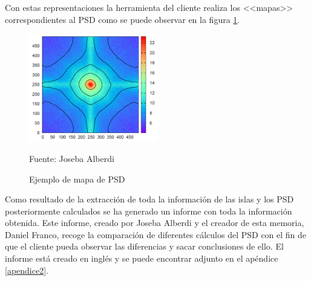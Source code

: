 Con estas representaciones la herramienta del cliente realiza los <<mapas>> correspondientes al PSD como se puede observar en la figura \ref{PSDmap}.

\begin{figure}[H]
	\captionsetup{justification=centering}
	\centering
	\includegraphics[width=0.5\textwidth]{./imagenes/PSDmap}
	\caption{Ejemplo de mapa de PSD}	
	Fuente: Joseba Alberdi
	\label{PSDmap}
\end{figure}

	
Como resultado de la extracci\'{o}n de toda la informaci\'{o}n de las islas y los PSD posteriormente calculados se ha generado un informe con toda la informaci\'{o}n obtenida. Este informe, creado por Joseba Alberdi y el creador de esta memoria, Daniel Franco, recoge la comparaci\'{o}n de diferentes c\'{a}lculos del PSD con el fin de que el cliente pueda observar las diferencias y sacar conclusiones de ello. El informe est\'{a} creado en ingl\'{e}s y se puede encontrar adjunto en el ap\'{e}ndice \ref{apendice2}. 